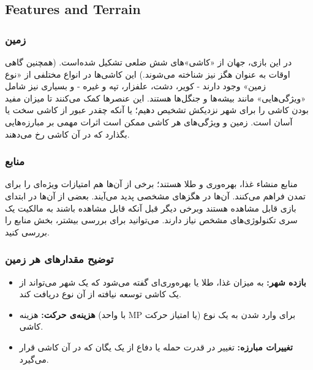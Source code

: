 \documentclass[]{article}
\begin{document}
\subsection*{{\titr Features and Terrain}}

\subsubsection*{{\titr زمین}}
در این بازی، جهان از «کاشی‌»های شش ضلعی تشکیل شده‌است. (همچنین گاهی اوقات به عنوان هگز نیز شناخته می‌شوند.) این کاشی‌ها در انواع مختلفی از «نوع زمین» وجود دارند - کویر، دشت، علفزار، تپه و غیره - و بسیاری نیز شامل «ویژگی‌هایی» مانند بیشه‌ها و جنگل‌ها هستند. این عنصرها کمک می‌کنند تا میزان مفید بودن کاشی را برای شهر نزدیکش تشخیص دهیم؛ یا آنکه چقدر عبور از کاشی سخت یا آسان است. زمین و ویژگی‌های هر کاشی ممکن است اثرات مهمی بر مبارزه‌هایی بگذارد که در آن کاشی رخ می‌دهند.

\subsubsection*{{\titr منابع}}
منابع منشاء غذا، بهره‌وری و طلا هستند؛‌ برخی از آن‌ها هم امتیازات ویژه‌ای را برای تمدن فراهم می‌کنند. آن‌ها در هگزهای مشخصی پدید می‌آیند. بعضی از آن‌ها در ابتدای بازی قابل مشاهده هستند وبرخی دیگر قبل آنکه قابل مشاهده باشند به مالکیت یک سری تکنولوژی‌های مشخص نیاز دارند. می‌توانید برای بررسی بیشتر، بخش منابع را بررسی کنید.
\\

\subsubsection*{{\titr توضیح مقدارهای هر زمین}}

\begin{itemize}
	\item \textbf{بازده شهر:} به میزان غذا، طلا یا بهره‌وری‌ای گفته می‌شود که یک شهر می‌تواند از یک کاشی توسعه نیافته از آن نوع دریافت کند.
	\item \textbf{هزینه‌ی حرکت:} هزینه (با واحد MP یا امتیاز حرکت) برای وارد شدن به یک نوع کاشی.
	\item \textbf{تغییرات مبارزه:} تغییر در قدرت حمله یا دفاع از یک یگان که در آن کاشی قرار می‌گیرد.
\end{itemize}
\end{document}
